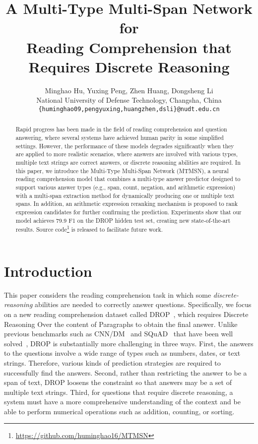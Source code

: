 \documentclass[11pt,a4paper]{article}
\title{A Multi-Type Multi-Span Network for \\ Reading Comprehension that Requires Discrete Reasoning}
\author{
Minghao Hu,
Yuxing Peng,
Zhen Huang,
Dongsheng Li \\ 
National University of Defense Technology, Changsha, China \\
{\tt \{huminghao09,pengyuxing,huangzhen,dsli\}@nudt.edu.cn}}
\date{}
\begin{document}
\maketitle

\begin{abstract}
Rapid progress has been made in the field of reading comprehension and question answering, where several systems have achieved human parity in some simplified settings.
However, the performance of these models degrades significantly when they are applied to more realistic scenarios, where answers are involved with various types, multiple text strings are correct answers, or discrete reasoning abilities are required.
In this paper, we introduce the Multi-Type Multi-Span Network (MTMSN), a neural reading comprehension model that combines a multi-type answer predictor designed to support various answer types (e.g., span, count, negation, and arithmetic expression) with a multi-span extraction method for dynamically producing one or multiple text spans.
In addition, an arithmetic expression reranking mechanism is proposed to rank expression candidates for further confirming the prediction.
Experiments show that our model achieves 79.9 F1 on the DROP hidden test set, creating new state-of-the-art results.
Source code\footnote{\url{https://github.com/huminghao16/MTMSN}} is released to facilitate future work.
\end{abstract} \section{Introduction}


This paper considers the reading comprehension task in which some \emph{discrete-reasoning} abilities are needed to correctly answer questions.
Specifically, we focus on a new reading comprehension dataset called DROP~\cite{dua2019drop}, which requires Discrete Reasoning Over the content of Paragraphs to obtain the final answer.
Unlike previous benchmarks such as CNN/DM~\cite{hermann2015teaching} and SQuAD~\cite{Rajpurkar16} that have been well solved~\cite{chen2016thorough,devlin2018bert}, DROP is substantially more challenging in three ways.
First, the answers to the questions involve a wide range of types such as numbers, dates, or text strings.
Therefore, various kinds of prediction strategies are required to successfully find the answers.  
Second, rather than restricting the answer to be a span of text, DROP loosens the constraint so that answers may be a set of multiple text strings.
Third, for questions that require discrete reasoning, a system must have a more comprehensive understanding of the context and be able to perform numerical operations such as addition, counting, or sorting. 
\end{document}
